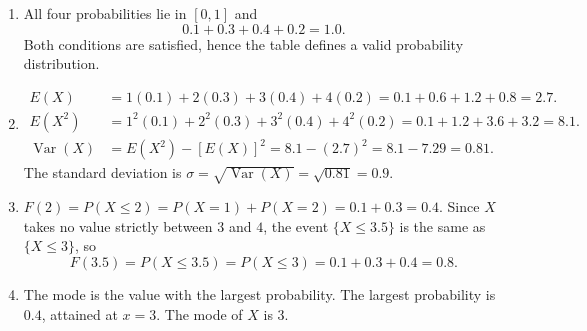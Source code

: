 \documentclass[11pt]{article}
\begin{document}
\begin{corrige}
\begin{enumerate}
\item All four probabilities lie in $[0,1]$ and
\[ 0.1 + 0.3 + 0.4 + 0.2 = 1.0. \]
Both conditions are satisfied, hence the table defines a valid probability distribution.
\item 
\begin{align*}
E(X) &= 1(0.1) + 2(0.3) + 3(0.4) + 4(0.2) = 0.1 + 0.6 + 1.2 + 0.8 = 2.7. \\
E(X^2) &= 1^2(0.1) + 2^2(0.3) + 3^2(0.4) + 4^2(0.2) = 0.1 + 1.2 + 3.6 + 3.2 = 8.1. \\
\operatorname{Var}(X) &= E(X^2) - [E(X)]^2 = 8.1 - (2.7)^2 = 8.1 - 7.29 = 0.81.
\end{align*}
The standard deviation is $\sigma = \sqrt{\operatorname{Var}(X)} = \sqrt{0.81} = 0.9$.
\item $F(2) = P(X \le 2) = P(X=1) + P(X=2) = 0.1 + 0.3 = 0.4$. Since $X$ takes no value strictly between $3$ and $4$, the event $\{X \le 3.5\}$ is the same as $\{X \le 3\}$, so
\[ F(3.5) = P(X \le 3.5) = P(X \le 3) = 0.1 + 0.3 + 0.4 = 0.8. \]
\item The mode is the value with the largest probability. The largest probability is $0.4$, attained at $x = 3$. The mode of $X$ is $3$.
\end{enumerate}
\end{corrige}
\end{document}
